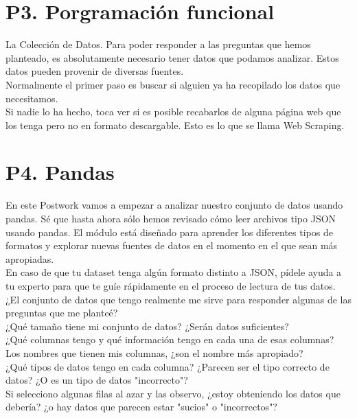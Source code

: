 \documentclass{article}
\begin{document}
\section{P3. Porgramación funcional}
La Colección de Datos. Para poder responder a las preguntas que hemos planteado, es absolutamente necesario tener datos que podamos analizar. Estos datos pueden provenir de diversas fuentes. \\
Normalmente el primer paso es buscar si alguien ya ha recopilado los datos que necesitamos.\\
Si nadie lo ha hecho, toca ver si es posible recabarlos de alguna página web que los tenga pero no en formato descargable. Esto es lo que se llama Web Scraping.
\section{P4. Pandas}
En este Postwork vamos a empezar a analizar nuestro conjunto de datos usando pandas. Sé que hasta ahora sólo hemos revisado cómo leer archivos tipo JSON usando pandas. El módulo está diseñado para aprender los diferentes tipos de formatos y explorar nuevas fuentes de datos en el momento en el que sean más apropiadas.\\
En caso de que tu dataset tenga algún formato distinto a JSON, pídele ayuda a tu experto para que te guíe rápidamente en el proceso de lectura de tus datos.\\
¿El conjunto de datos que tengo realmente me sirve para responder algunas de las preguntas que me planteé?\\
¿Qué tamaño tiene mi conjunto de datos? ¿Serán datos suficientes?\\
¿Qué columnas tengo y qué información tengo en cada una de esas columnas?\\
Los nombres que tienen mis columnas, ¿son el nombre más apropiado?\\
¿Qué tipos de datos tengo en cada columna? ¿Parecen ser el tipo correcto de datos? ¿O es un tipo de datos "incorrecto"?\\
Si selecciono algunas filas al azar y las observo, ¿estoy obteniendo los datos que debería? ¿o hay datos que parecen estar "sucios" o "incorrectos"?
\end{document}
